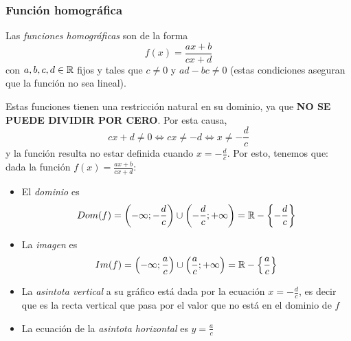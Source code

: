 \documentclass[../teoria.root.tex]{subfiles}
\begin{document}
\subsubsection{Función homográfica}
Las \textit{funciones homográficas} son de la forma \[f(x)=\frac{ax+b}{cx+d}\] con \(a,b,c,d \in \mathbb{R}\) fijos y tales que \(c\neq0\) y \(ad-bc\neq0\) (estas condiciones aseguran que la función no sea lineal).
\begin{center}
\end{center}
Estas funciones tienen una restricción natural en su dominio, ya que \textbf{NO SE PUEDE DIVIDIR POR CERO}.
Por esta causa, \[cx+d\neq0\Longleftrightarrow cx\neq-d\Longleftrightarrow x\neq-\frac{d}{c}\] y la función resulta no estar definida cuando \(x=-\frac{d}{c}\).
Por esto, tenemos que:
dada la función \(f(x)=\frac{ax+b}{cx+d}\):
\begin{itemize}
    \item El \textit{dominio} es \[Dom(f)=\left(-\infty;-\frac{d}{c}\right)\cup\left(-\frac{d}{c};+\infty\right)=\mathbb{R}-\left\{-\frac{d}{c}\right\}\]
    \item La \textit{imagen} es \[Im(f)=\left(-\infty;\frac{a}{c}\right)\cup\left(\frac{a}{c};+\infty\right)=\mathbb{R}-\left\{\frac{a}{c}\right\}\]
    \item La \textit{asintota vertical} a su gráfico está dada por la ecuación \(x=-\frac{d}{c}\), es decir que es la recta vertical que pasa por el valor que no está en el dominio de \(f\)
    \item La ecuación de la \textit{asintota horizontal} es \(y=\frac{a}{c}\)
\end{itemize}
\end{document}
